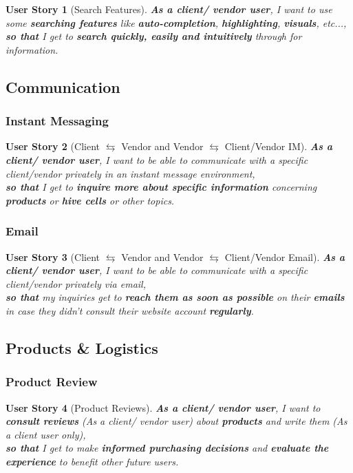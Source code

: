 \documentclass[a4paper,12pt]{book}
\theoremstyle{break}
\newtheorem{userStory}{User Story}
\theoremstyle{break}
\theoremstyle{definition}
\theoremstyle{remark}
\begin{document}
\begin{userStory}[Search Features]
\textbf{As a {\color{green} client}/{\color{red} vendor} user}, I want to use some \textbf{searching features} like \textbf{auto-completion}, \textbf{highlighting}, \textbf{visuals}, etc...,\\
\indent
\textbf{so that} I get to \textbf{search quickly, easily and intuitively} through for information.
\end{userStory}

\subsection{Communication}
\subsubsection{Instant Messaging}
\begin{userStory}[Client $\leftrightarrows$ Vendor and Vendor $\leftrightarrows$ Client/Vendor IM]
\textbf{As a {\color{green} client}/{\color{red} vendor} user}, I want to be able to communicate with a specific client/vendor privately in an instant message environment,\\
\indent
\textbf{so that} I get to \textbf{inquire more about specific information} concerning \textbf{products} or \textbf{hive cells} or other topics.
\end{userStory}

\subsubsection{Email}
\begin{userStory}[Client $\leftrightarrows$ Vendor and Vendor $\leftrightarrows$ Client/Vendor Email]
\textbf{As a {\color{green} client}/{\color{red} vendor} user}, I want to be able to communicate with a specific client/vendor privately via email,\\
\indent
\textbf{so that} my inquiries get to \textbf{reach them as soon as possible} on their \textbf{emails} in case they didn't consult their website account \textbf{regularly}.
\end{userStory}

\subsection{Products \& Logistics}
\subsubsection{Product Review}
\begin{userStory}[Product Reviews]
\textbf{As a {\color{green} client}/{\color{red} vendor} user}, I want to \textbf{consult reviews} (As a {\color{green} client}/{\color{red} vendor} user) about \textbf{products} and write them (As a {\color{green} client} user only),\\
\indent
\textbf{so that} I get to make \textbf{informed purchasing decisions} and \textbf{evaluate the experience} to benefit other future users.
\end{userStory}
\end{document}
